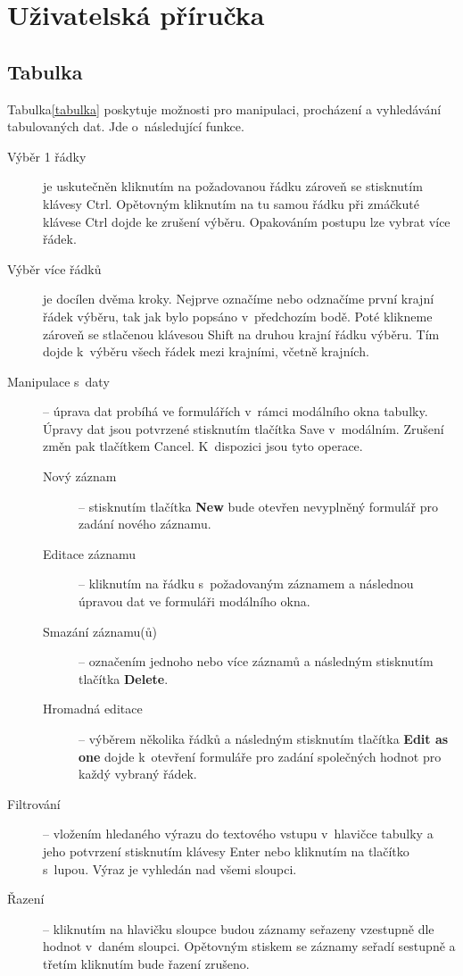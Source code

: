 \documentclass[thesis=B,czech]{FITthesis}[2012/06/26]
\begin{document}
\section{Uživatelská příručka}

\subsection{Tabulka}
	Tabulka\ref{tabulka} poskytuje možnosti pro manipulaci, procházení a vyhledávání tabulovaných dat. Jde o~následující funkce.
	\begin{description}
		\item[Výběr 1 řádky] je uskutečněn kliknutím na požadovanou řádku zároveň se stisknutím klávesy Ctrl. Opětovným kliknutím na tu samou řádku při zmáčkuté klávese Ctrl dojde ke zrušení výběru. Opakováním postupu lze vybrat více řádek.
		\item[Výběr více řádků] je docílen dvěma kroky. Nejprve označíme nebo odznačíme první krajní řádek výběru, tak jak bylo popsáno v~předchozím bodě. Poté klikneme zároveň se stlačenou klávesou Shift na druhou krajní řádku výběru. Tím dojde k~výběru všech řádek mezi krajními, včetně krajních.
		\item[Manipulace s~daty] -- úprava dat probíhá ve formulářích v~rámci modálního okna tabulky. Úpravy dat jsou potvrzené stisknutím tlačítka Save v~modálním. Zrušení změn pak tlačítkem Cancel. K~dispozici jsou tyto operace.
			\begin{description}
				\item[Nový záznam] -- stisknutím tlačítka \textbf{New} bude otevřen nevyplněný formulář pro zadání nového záznamu.
				\item[Editace záznamu] -- kliknutím na řádku s~požadovaným záznamem a následnou úpravou dat ve formuláři modálního okna.
				\item[Smazání záznamu(ů)] -- označením jednoho nebo více záznamů a následným stisknutím tlačítka \textbf{Delete}.
				\item[Hromadná editace] -- výběrem několika řádků a následným stisknutím tlačítka \textbf{Edit as one} dojde k~otevření formuláře pro zadání společných hodnot pro každý vybraný řádek.
			\end{description}
		\item[Filtrování] -- vložením hledaného výrazu do textového vstupu v~hlavičce tabulky a jeho potvrzení stisknutím klávesy Enter nebo kliknutím na tlačítko s~lupou. Výraz je vyhledán nad všemi sloupci.
		\item[Řazení] -- kliknutím na hlavičku sloupce budou záznamy seřazeny vzestupně dle hodnot v~daném sloupci. Opětovným stiskem se záznamy seřadí sestupně a třetím kliknutím bude řazení zrušeno.

\end{description}
\end{document}
